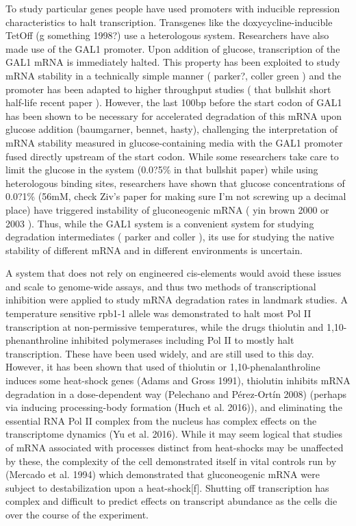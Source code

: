 To study
particular genes people have used promoters with inducible repression
characteristics to halt transcription. Transgenes like the
doxycycline-inducible TetOff (g something 1998?) use a heterologous
system. Researchers have also made use of the GAL1 promoter. Upon
addition of glucose, transcription of the GAL1 mRNA is immediately
halted. This property has been exploited to study mRNA stability in a
technically simple manner ( parker?, coller green ) and the promoter
has been adapted to higher throughput studies ( that bullshit short
half-life recent paper ). However, the last 100bp before the start
codon of GAL1 has been shown to be necessary for accelerated
degradation of this mRNA upon glucose addition (baumgarner, bennet,
hasty), challenging the interpretation of mRNA stability measured in
glucose-containing media with the GAL1 promoter fused directly
upstream of the start codon. While some researchers take care to limit
the glucose in the system (0.0?5\% in that bullshit paper) while using
heterologous binding sites, researchers have shown that glucose
concentrations of 0.0?1\% (56mM, check Ziv’s paper for making sure I’m
not screwing up a decimal place) have triggered instability of
gluconeogenic mRNA ( yin brown 2000 or 2003 ). Thus, while the GAL1
system is a convenient system for studying degradation intermediates (
parker and coller ), its use for studying the native stability of
different mRNA and in different environments is uncertain.  

A system
that does not rely on engineered cis-elements would avoid these issues
and scale to genome-wide assays, and thus two methods of
transcriptional inhibition were applied to study mRNA degradation
rates in landmark studies. A temperature sensitive rpb1-1 allele was
demonstrated to halt most Pol II transcription at non-permissive
temperatures, while the drugs thiolutin and 1,10-phenanthroline
inhibited polymerases including Pol II to mostly halt transcription.
These have been used widely, and are still used to this day. However,
it has been shown that used of thiolutin or 1,10-phenalanthroline
induces some heat-shock genes (Adams and Gross 1991), thiolutin
inhibits mRNA degradation in a dose-dependent way (Pelechano and
Pérez-Ortín 2008) (perhaps via inducing processing-body formation
(Huch et al. 2016)), and eliminating the essential RNA Pol II complex
from the nucleus has complex effects on the transcriptome dynamics (Yu
et al. 2016). While it may seem logical that studies of mRNA
associated with processes distinct from heat-shocks may be unaffected
by these, the complexity of the cell demonstrated itself in vital
controls run by (Mercado et al. 1994) which demonstrated that
gluconeogenic mRNA were subject to destabilization upon a
heat-shock[f]. Shutting off transcription has complex and difficult to
predict effects on transcript abundance as the cells die over the
course of the experiment.  

